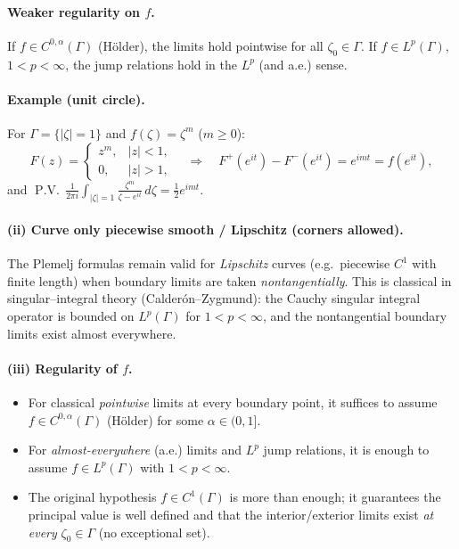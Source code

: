 \documentclass[11pt]{article}
\begin{document}
	\paragraph{Weaker regularity on $f$.}
	If $f\in C^{0,\alpha}(\Gamma)$ (H\"older), the limits hold pointwise for all $\zeta_{0}\in\Gamma$.
	If $f\in L^{p}(\Gamma)$, $1<p<\infty$, the jump relations hold in the $L^{p}$ (and a.e.) sense.
	
	\medskip
	
	\paragraph{Example (unit circle).}
	For $\Gamma=\{|\zeta|=1\}$ and $f(\zeta)=\zeta^{m}$ ($m\ge0$):
	\[
	F(z)=\begin{cases} z^{m}, & |z|<1,\\ 0, & |z|>1,\end{cases}
	\quad\Rightarrow\quad
	F^{+}(e^{it})-F^{-}(e^{it})=e^{im t}=f(e^{it}),
	\]
	and
	\(
	\operatorname{P.V.}\,\frac{1}{2\pi i}\int_{|\zeta|=1}\frac{\zeta^{m}}{\zeta-e^{it}}\,d\zeta
	=\tfrac12 e^{imt}.
	\)
	
	\paragraph{(ii) Curve only piecewise smooth / Lipschitz (corners allowed).}
	The Plemelj formulas remain valid for \emph{Lipschitz} curves (e.g.\ piecewise $C^{1}$ with finite length) when boundary limits are taken \emph{nontangentially}.
	This is classical in singular–integral theory (Calder\'on–Zygmund): the Cauchy singular integral operator is bounded on $L^{p}(\Gamma)$ for $1<p<\infty$, and the nontangential boundary limits exist almost everywhere.
	
	\medskip
	
	\paragraph{(iii) Regularity of $f$.}
	\begin{itemize}
		\item For classical \emph{pointwise} limits at every boundary point, it suffices to assume $f\in C^{0,\alpha}(\Gamma)$ (H\"older) for some $\alpha\in(0,1]$.
		\item For \emph{almost-everywhere} (a.e.) limits and $L^{p}$ jump relations, it is enough to assume $f\in L^{p}(\Gamma)$ with $1<p<\infty$.
		\item The original hypothesis $f\in C^{1}(\Gamma)$ is more than enough; it guarantees the principal value is well defined and that the interior/exterior limits exist \emph{at every} $\zeta_{0}\in\Gamma$ (no exceptional set).
	\end{itemize}
	
\end{document}
